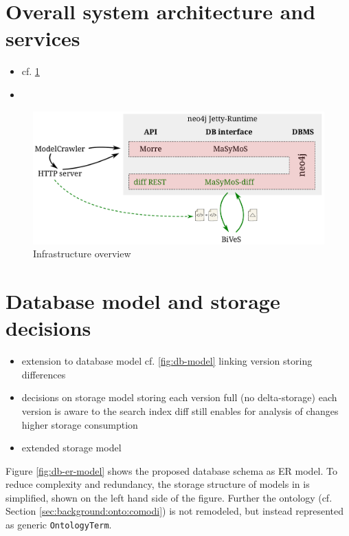 \section{Overall system architecture and services}
\begin{itemize}
	\item cf. \ref{fig:system-overview}
	\item {}
\end{itemize}

\begin{figure}[h]
	\centering
	\includegraphics[width=\textwidth]{resources/system-overview-matrix.pdf}
	\caption{Infrastructure overview}
	\label{fig:system-overview}
\end{figure}

\section{Database model and storage decisions}
\begin{itemize}
\item extension to database model cf. \ref{fig:db-model}
	\subitem linking version
	\subitem storing differences
\item decisions on storage model
	\subitem storing each version full (no delta-storage)
	\subitem each version is aware to the search index
	\subitem diff still enables for analysis of changes
	\subitem higher storage consumption
\item extended storage model
\end{itemize}
Figure \ref{fig:db-er-model} shows the proposed database schema as ER model. To reduce complexity and redundancy, the storage structure of models in \masymos is simplified, shown on the left hand side of the figure. Further the \comodi ontology (cf. Section \ref{sec:background:onto:comodi}) is not remodeled, but instead represented as generic \texttt{OntologyTerm}.

